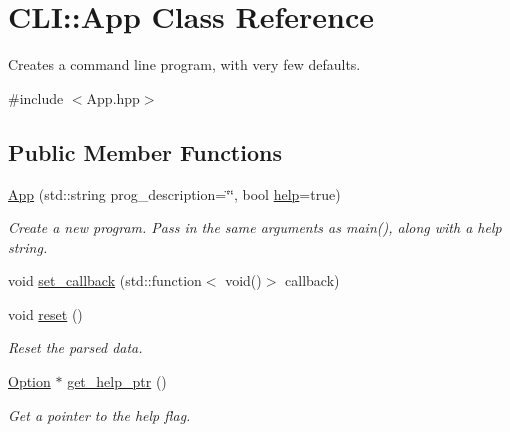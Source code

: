 \hypertarget{class_c_l_i_1_1_app}{}\section{C\+LI\+:\+:App Class Reference}
\label{class_c_l_i_1_1_app}


Creates a command line program, with very few defaults.  




{\ttfamily \#include $<$App.\+hpp$>$}

\subsection*{Public Member Functions}
\begin{DoxyCompactItemize}
\item 
\mbox{\label{class_c_l_i_1_1_app_ae5482944437e3fb6fe8af3e55b02caa9}} 
\hyperlink{class_c_l_i_1_1_app_ae5482944437e3fb6fe8af3e55b02caa9}{App} (std\+::string prog\+\_\+description=\char`\"{}\char`\"{}, bool \hyperlink{class_c_l_i_1_1_app_ab85cc077e2dfee3bd94eed8c61e1e2ea}{help}=true)
\begin{DoxyCompactList}\small\item\em Create a new program. Pass in the same arguments as main(), along with a help string. \end{DoxyCompactList}\item 
void \hyperlink{class_c_l_i_1_1_app_a9a02c341de7711e71739a4b34a251b0e}{set\+\_\+callback} (std\+::function$<$ void()$>$ callback)
\item 
\mbox{\label{class_c_l_i_1_1_app_a3015463e1169614efbedc884606cad67}} 
void \hyperlink{class_c_l_i_1_1_app_a3015463e1169614efbedc884606cad67}{reset} ()
\begin{DoxyCompactList}\small\item\em Reset the parsed data. \end{DoxyCompactList}\item 
\mbox{\label{class_c_l_i_1_1_app_ae3ed738a07047fd1d76c228d41804a76}} 
\hyperlink{class_c_l_i_1_1_option}{Option} $\ast$ \hyperlink{class_c_l_i_1_1_app_ae3ed738a07047fd1d76c228d41804a76}{get\+\_\+help\+\_\+ptr} ()
\begin{DoxyCompactList}\small\item\em Get a pointer to the help flag. \end{DoxyCompactList}\item 

\end{DoxyCompactItemize}

